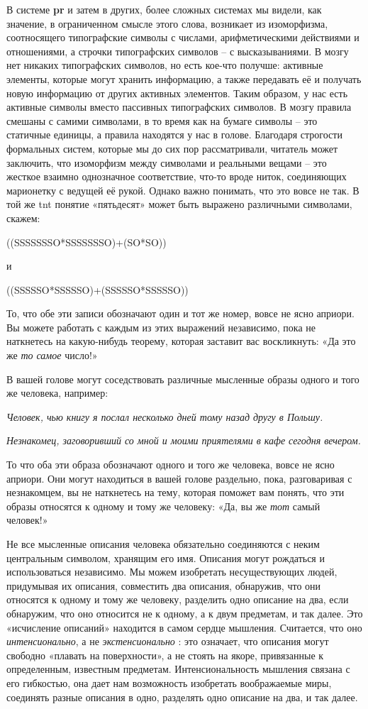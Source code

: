 \documentclass[../main.tex]{subfiles}
\begin{document}
В системе \textbf{pr} и затем в других, более сложных системах мы видели, как значение, в ограниченном смысле этого слова, возникает из изоморфизма, соотносящего типографские символы с числами, арифметическими действиями и отношениями, а строчки типографских символов \--- с высказываниями. В мозгу нет никаких типографских символов, но есть кое-что получше: активные элементы, которые могут хранить информацию, а также передавать её и получать новую информацию от других активных элементов. Таким образом, у нас есть активные символы вместо пассивных типографских символов. В мозгу правила смешаны с самими символами, в то время как на бумаге символы \--- это статичные единицы, а правила находятся у нас в голове. Благодаря строгости формальных систем, которые мы до сих пор рассматривали, читатель может заключить, что изоморфизм между символами и реальными вещами \--- это жесткое взаимно однозначное соответствие, что-то вроде ниток, соединяющих марионетку с ведущей её рукой. Однако важно понимать, что это вовсе не так. В той же \acs{tnt} понятие «пятьдесят» может быть выражено различными символами, скажем:

((SSSSSSSO*SSSSSSSO)+(SO*SO))

и

((SSSSSO*SSSSSO)+(SSSSSO*SSSSSO))

То, что обе эти записи обозначают один и тот же номер, вовсе не ясно априори. Вы можете работать с каждым из этих выражений независимо, пока не наткнетесь на какую-нибудь теорему, которая заставит вас воскликнуть: «Да это же \emph{то самое} число!»

В вашей голове могут соседствовать различные мысленные образы одного и того же человека, например:

\emph{Человек, чью книгу я послал несколько дней тому назад другу в Польшу.}

\emph{Незнакомец, заговоривший со мной и моими приятелями в кафе сегодня вечером.}

То что оба эти образа обозначают одного и того же человека, вовсе не ясно априори. Они могут находиться в вашей голове раздельно, пока, разговаривая с незнакомцем, вы не наткнетесь на тему, которая поможет вам понять, что эти образы относятся к одному и тому же человеку: «Да, вы же \emph{тот} самый человек!»

Не все мысленные описания человека обязательно соединяются с неким центральным символом, хранящим его имя. Описания могут рождаться и использоваться независимо. Мы можем изобретать несуществующих людей, придумывая их описания, совместить два описания, обнаружив, что они относятся к одному и тому же человеку, разделить одно описание на два, если обнаружим, что оно относится не к одному, а к двум предметам, и так далее. Это «исчисление описаний» находится в самом сердце мышления. Считается, что оно \emph{интенсионально}, а не \emph{экстенсионально} : это означает, что описания могут свободно «плавать на поверхности», а не стоять на якоре, привязанные к определенным, известным предметам. Интенсиональность мышления связана с его гибкостью, она дает нам возможность изобретать воображаемые миры, соединять разные описания в одно, разделять одно описание на два, и так далее.
\end{document}
